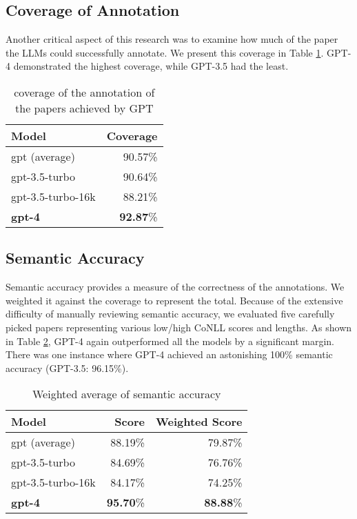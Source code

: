 \subsection{Coverage of Annotation}
Another critical aspect of this research was to examine how much of the paper the LLMs could successfully annotate. We present this coverage in Table \ref{tab:anno-percentage}. GPT-4 demonstrated the highest coverage, while GPT-3.5 had the least.

\begin{table}[htpb]
  \centering
  \begin{tabular}{lr}
    \hline
    Model & Coverage \\
    \hline
    gpt (average) & 90.57\% \\
    gpt-3.5-turbo & 90.64\% \\
    gpt-3.5-turbo-16k & 88.21\% \\
    \textbf{gpt-4} & \textbf{92.87}\% \\
    \hline
  \end{tabular}
  \caption[Total coverage]{coverage of the annotation of the papers achieved by GPT}
  \label{tab:anno-percentage}
\end{table}

\subsection{Semantic Accuracy}
Semantic accuracy provides a measure of the correctness of the annotations. We weighted it against the coverage to represent the total. Because of the extensive difficulty of manually reviewing semantic accuracy, we evaluated five carefully picked papers representing various low/high CoNLL scores and lengths. As shown in Table \ref{tab:semantic-accuracy}, GPT-4 again outperformed all the models by a significant margin. There was one instance where GPT-4 achieved an astonishing 100\% semantic accuracy (GPT-3.5: 96.15\%).

\begin{table}[htpb]
  \centering
  \begin{tabular}{lrr}
    \hline
    Model & Score & Weighted Score \\
    \hline
    gpt (average) & 88.19\% & 79.87\% \\
    gpt-3.5-turbo & 84.69\% & 76.76\% \\
    gpt-3.5-turbo-16k & 84.17\% & 74.25\% \\
    \textbf{gpt-4} & \textbf{95.70}\% & \textbf{88.88}\% \\
    \hline
  \end{tabular}
  \caption[Semantic Accuracy]{Weighted average of semantic accuracy}
  \label{tab:semantic-accuracy}
\end{table}

